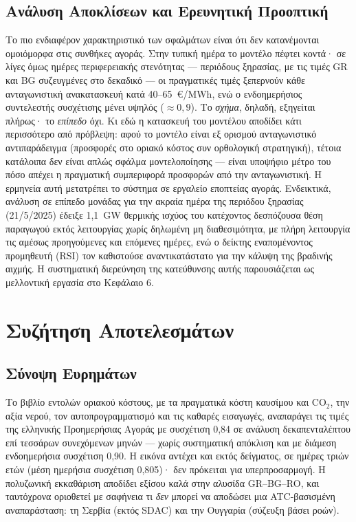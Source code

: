 \subsection{Ανάλυση Αποκλίσεων και Ερευνητική Προοπτική}
\label{subsec:deviation-analysis}

Το πιο ενδιαφέρον χαρακτηριστικό των σφαλμάτων είναι ότι δεν κατανέμονται ομοιόμορφα στις συνθήκες αγοράς. Στην τυπική ημέρα το μοντέλο πέφτει κοντά· σε λίγες όμως ημέρες περιφερειακής στενότητας --- περιόδους ξηρασίας, με τις τιμές GR και BG συζευγμένες στο δεκαδικό --- οι πραγματικές τιμές ξεπερνούν κάθε ανταγωνιστική ανακατασκευή κατά 40--65~€/MWh, ενώ ο ενδοημερήσιος συντελεστής συσχέτισης μένει υψηλός ($\approx 0{,}9$). Το \emph{σχήμα}, δηλαδή, εξηγείται πλήρως· το \emph{επίπεδο} όχι. Κι εδώ η κατασκευή του μοντέλου αποδίδει κάτι περισσότερο από πρόβλεψη: αφού το μοντέλο είναι εξ ορισμού ανταγωνιστικό αντιπαράδειγμα (προσφορές στο οριακό κόστος συν ορθολογική στρατηγική), τέτοια κατάλοιπα δεν είναι απλώς σφάλμα μοντελοποίησης --- είναι υποψήφιο μέτρο του πόσο απέχει η πραγματική συμπεριφορά προσφορών από την ανταγωνιστική. Η ερμηνεία αυτή μετατρέπει το σύστημα σε εργαλείο εποπτείας αγοράς. Ενδεικτικά, ανάλυση σε επίπεδο μονάδας για την ακραία ημέρα της περιόδου ξηρασίας (21/5/2025) έδειξε 1,1~GW θερμικής ισχύος του κατέχοντος δεσπόζουσα θέση παραγωγού εκτός λειτουργίας χωρίς δηλωμένη μη διαθεσιμότητα, με πλήρη λειτουργία τις αμέσως προηγούμενες και επόμενες ημέρες, ενώ ο δείκτης εναπομένοντος προμηθευτή (RSI) τον καθιστούσε αναντικατάστατο για την κάλυψη της βραδινής αιχμής. Η συστηματική διερεύνηση της κατεύθυνσης αυτής παρουσιάζεται ως μελλοντική εργασία στο Κεφάλαιο 6.


\section{Συζήτηση Αποτελεσμάτων}
\label{sec:results-discussion}

\subsection{Σύνοψη Ευρημάτων}
\label{subsec:findings-summary}

Το βιβλίο εντολών οριακού κόστους, με τα πραγματικά κόστη καυσίμου και CO$_2$, την αξία νερού, τον αυτοπρογραμματισμό και τις καθαρές εισαγωγές, αναπαράγει τις τιμές της ελληνικής Προημερήσιας Αγοράς με συσχέτιση 0,84 σε ανάλυση δεκαπενταλέπτου επί τεσσάρων συνεχόμενων μηνών --- χωρίς συστηματική απόκλιση και με διάμεση ενδοημερήσια συσχέτιση 0,90. Η εικόνα αντέχει και εκτός δείγματος, σε ημέρες τριών ετών (μέση ημερήσια συσχέτιση 0,805)· δεν πρόκειται για υπερπροσαρμογή. Η πολυζωνική εκκαθάριση αποδίδει εξίσου καλά στην αλυσίδα GR--BG--RO, και ταυτόχρονα οριοθετεί με σαφήνεια τι \emph{δεν} μπορεί να αποδώσει μια ATC-βασισμένη αναπαράσταση: τη Σερβία (εκτός SDAC) και την Ουγγαρία (σύζευξη βάσει ροών).

